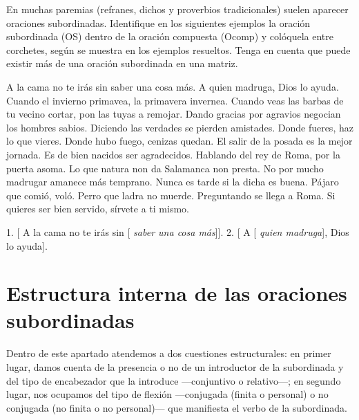 
\begin{ejercicio}\label{ej:13-paremias}
En muchas paremias (refranes, dichos y proverbios tradicionales) suelen aparecer
oraciones subordinadas. Identifique en los siguientes ejemplos la oración
subordinada (OS) dentro de la oración compuesta (Ocomp) y colóquela entre
corchetes, según se muestra en los ejemplos resueltos. Tenga en cuenta que puede
existir más de una oración subordinada en una matriz.

\begin{exe}
  \ex A la cama no te irás sin saber una cosa más.
  \ex A quien madruga, Dios lo ayuda.
  \ex Cuando el invierno primavea, la primavera invernea.
  \ex Cuando veas las barbas de tu vecino cortar, pon las tuyas a remojar.
  \ex Dando gracias por agravios negocian los hombres sabios.
  \ex Diciendo las verdades se pierden amistades.
  \ex Donde fueres, haz lo que vieres.
  \ex Donde hubo fuego, cenizas quedan.
  \ex El salir de la posada es la mejor jornada.
  \ex Es de bien nacidos ser agradecidos.
  \ex Hablando del rey de Roma, por la puerta asoma.
  \ex Lo que natura non da Salamanca non presta.
  \ex No por mucho madrugar amanece más temprano.
  \ex Nunca es tarde si la dicha es buena.
  \ex Pájaro que comió, voló.
  \ex Perro que ladra no muerde.
  \ex Preguntando se llega a Roma.
  \ex Si quieres ser bien servido, sírvete a ti mismo.
\end{exe}

\begin{resuelto}
1. [ A la cama no te irás sin [ \textit{saber una cosa más}]].
2. [ A [ \textit{quien madruga}], Dios lo ayuda].
\end{resuelto}
\end{ejercicio}

\section{Estructura interna de las oraciones subordinadas}\label{sec:13-estructura}

Dentro de este apartado atendemos a dos cuestiones estructurales: en primer
lugar, damos cuenta de la presencia o no de un introductor de la subordinada y
del tipo de encabezador que la introduce ---conjuntivo o relativo---; en segundo
lugar, nos ocupamos del tipo de flexión ---conjugada (finita o personal) o no
conjugada (no finita o no personal)--- que manifiesta el verbo de la subordinada.

